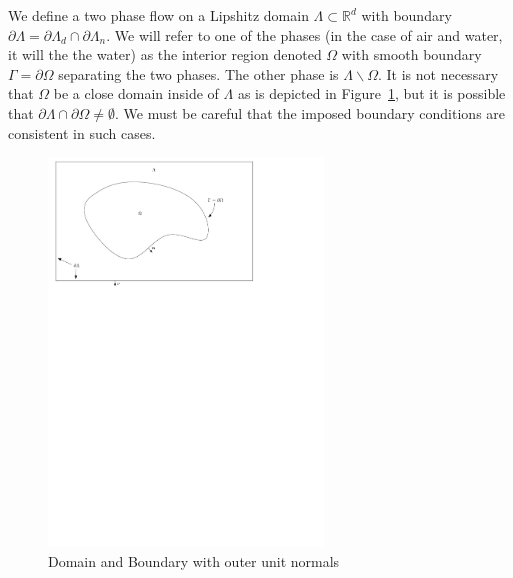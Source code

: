 \documentclass[letterpaper]{erdc}
\begin{document}
We define a two phase flow on a Lipshitz domain $\Lambda\subset\mathbb{R}^d$
with boundary $\partial\Lambda = \partial\Lambda_{d}\cap\partial\Lambda_{n}$.
We will refer to one of the phases (in the case of air and water, it will the
the water) as the interior region denoted $\Omega$ with smooth boundary
$\Gamma = \partial\Omega$ separating the two phases.  The other phase is
$\Lambda\backslash\Omega$.  It is not necessary that $\Omega$ be a close domain
inside of $\Lambda$ as is depicted in Figure~\ref{fig:DomainAndBoundary}, but
it is possible that $\partial\Lambda\cap \partial\Omega \neq \emptyset$.  We
must be careful that the imposed boundary conditions are consistent in such
cases.
\begin{figure}[h!]
  \centering
    \includegraphics[width=0.65\textwidth]{DomainAndBoundaryForNavierStokes}
  \caption{Domain and Boundary with outer unit normals}
  \label{fig:DomainAndBoundary}
\end{figure}
\end{document}
